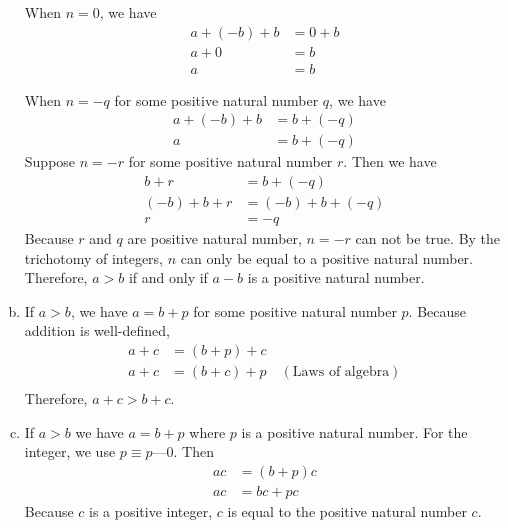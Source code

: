 \documentclass[12pt]{article}
\begin{document}
\begin{flushleft}
\begin{enumerate}[(a)]
    When \(n =0\), we have
    \begin{equation*}
      \begin{aligned}
        a + (-b) + b &= 0 + b \\
        a + 0 &=b\\
        a &= b
      \end{aligned}
    \end{equation*}

    When \(n = -q\) for some positive natural number \(q\), we have
    \begin{equation*}
      \begin{aligned}
        a + (-b) + b &= b+(-q) \\
        a &= b + (-q)
      \end{aligned}
    \end{equation*}
    Suppose \(n=-r\) for some positive natural number \(r\). Then we have
    \begin{equation*}
      \begin{aligned}
        b + r &= b + (-q)\\
        (-b) + b + r &= (-b) + b + (-q)\\
        r &= -q
      \end{aligned}
    \end{equation*}
    Because \(r\) and \(q\) are positive natural number, \(n=-r\) can not be true.
    By the trichotomy of integers, \(n\) can only be equal to a positive natural number.
    Therefore, \(a > b\) if and only if \(a-b\) is a positive natural number.

  \item If \(a>b\), we have \(a = b + p\) for some positive natural number \(p\). Because addition is well-defined,
    \begin{equation*}
      \begin{aligned}
        a + c &= (b+p) + c\\
        a+c &= (b+c) + p \quad (\text{Laws of algebra})\\
      \end{aligned}
    \end{equation*}
    Therefore, \(a+c > b+c\).

  \item If \(a>b\) we have \(a=b+p\) where \(p\) is a positive natural number.
    For the integer, we use \(p \equiv p \text{---}0\). Then
    \begin{equation*}
      \begin{aligned}
        ac &= (b+p)c\\
        ac &= bc+pc
      \end{aligned}
    \end{equation*}
    Because \(c\) is a positive integer, \(c\) is equal to the positive natural number \(c\).


\end{enumerate}
\end{flushleft}
\end{document}

